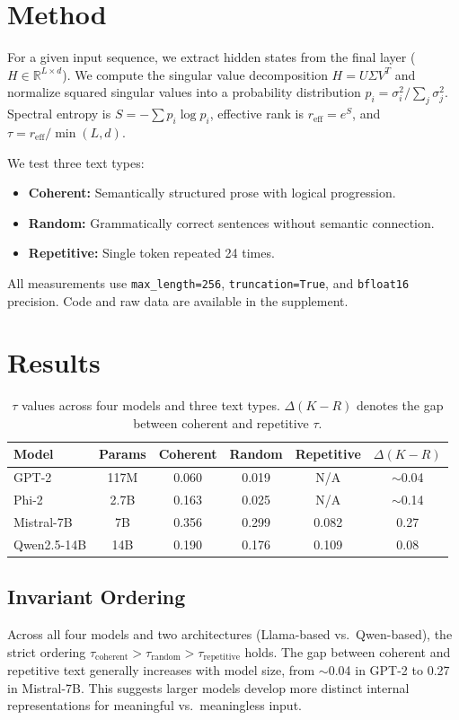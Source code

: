 \documentclass[10pt,a4paper]{article}
\begin{document}
\section{Method}
For a given input sequence, we extract hidden states from the final layer ($H \in \mathbb{R}^{L \times d}$). We compute the singular value decomposition $H = U\Sigma V^T$ and normalize squared singular values into a probability distribution $p_i = \sigma_i^2 / \sum_j \sigma_j^2$. Spectral entropy is $S = -\sum p_i \log p_i$, effective rank is $r_{\text{eff}} = e^S$, and $\tau = r_{\text{eff}} / \min(L, d)$.

We test three text types:
\begin{itemize}
    \item \textbf{Coherent:} Semantically structured prose with logical progression.
    \item \textbf{Random:} Grammatically correct sentences without semantic connection.
    \item \textbf{Repetitive:} Single token repeated 24 times.
\end{itemize}
All measurements use \texttt{max\_length=256}, \texttt{truncation=True}, and \texttt{bfloat16} precision. Code and raw data are available in the supplement.

\section{Results}

\begin{table}[htbp]
\centering
\caption{$\tau$ values across four models and three text types. $\Delta(K-R)$ denotes the gap between coherent and repetitive $\tau$.}
\label{tab:tau_results}
\small
\begin{tabular}{lccccc}
\toprule
\textbf{Model} & \textbf{Params} & \textbf{Coherent} & \textbf{Random} & \textbf{Repetitive} & \textbf{$\Delta(K-R)$} \\
\midrule
GPT-2 & 117M & 0.060 & 0.019 & N/A & $\sim$0.04 \\
Phi-2 & 2.7B & 0.163 & 0.025 & N/A & $\sim$0.14 \\
Mistral-7B & 7B & 0.356 & 0.299 & 0.082 & 0.27 \\
Qwen2.5-14B & 14B & 0.190 & 0.176 & 0.109 & 0.08 \\
\bottomrule
\end{tabular}
\end{table}

\subsection{Invariant Ordering}
Across all four models and two architectures (Llama-based vs.\ Qwen-based), the strict ordering $\tau_{\text{coherent}} > \tau_{\text{random}} > \tau_{\text{repetitive}}$ holds. The gap between coherent and repetitive text generally increases with model size, from $\sim$0.04 in GPT-2 to 0.27 in Mistral-7B. This suggests larger models develop more distinct internal representations for meaningful vs.\ meaningless input.
\end{document}
